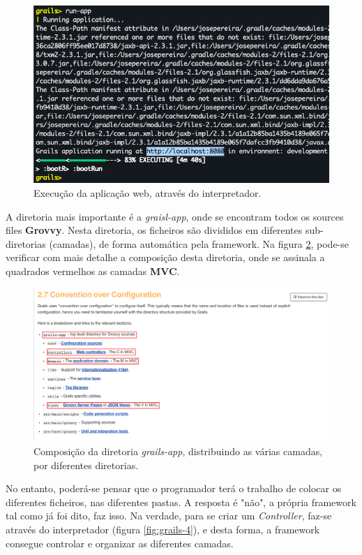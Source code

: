 \begin{figure}[H]
    \centering
    \includegraphics[scale=0.50]{images/grails-6.png}
    \caption{Execução da aplicação web, através do interpretador.}
    \label{fig:grails-6}
\end{figure}

\hspace{5mm} A diretoria mais importante é a \textit{graisl-app}, onde se encontram todos os sources files \textbf{Grovvy}. Nesta diretoria, os ficheiros são divididos em diferentes sub-diretorias (camadas), de forma automática pela framework. Na figura \ref{fig:grails-3}, pode-se verificar com mais detalhe a composição desta diretoria, onde se assinala a quadrados vermelhos as camadas \textbf{MVC}.

\begin{figure}[H]
    \centering
    \includegraphics[scale=0.50]{images/grails-3.png}
    \caption{Composição da diretoria \textit{grails-app}, distribuindo as várias camadas, por diferentes diretorias.}
    \label{fig:grails-3}
\end{figure}

\hspace{5mm} No entanto, poderá-se pensar que o programador terá o trabalho de colocar os diferentes ficheiros, nas diferentes pastas. A resposta é "não", a própria framework tal como já foi dito, faz isso. Na verdade, para se criar um \textit{Controller}, faz-se através do interpretador (figura \ref{fig:grails-4}), e desta forma, a framework consegue controlar e organizar as diferentes camadas. 

